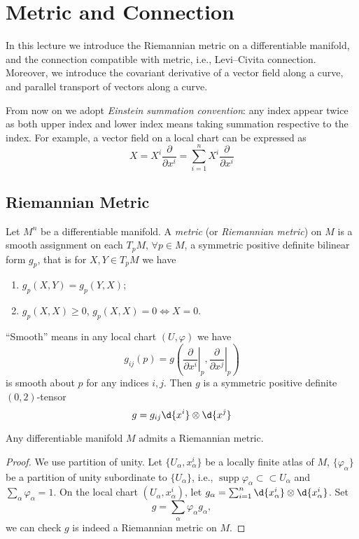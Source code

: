 \chapter{Metric and Connection}

In this lecture we introduce the Riemannian metric on a differentiable manifold, and the connection compatible with metric, i.e., Levi--Civita connection.
Moreover, we introduce the covariant derivative of a vector field along a curve, and parallel transport of vectors along a curve.

\begin{symb}
    From now on we adopt \emph{Einstein summation convention}:
    any index appear twice as both upper index and lower index means taking summation respective to the index.
    For example, a vector field on a local chart can be expressed as
    \[X=X^i\frac{\partial{}}{\partial{x^i}}=\sum_{i=1}^nX^i\frac{\partial{}}{\partial{x^i}}\]
\end{symb}

\section{Riemannian Metric}

\begin{defn}
    Let $M^n$ be a differentiable manifold.
    A \emph{metric} (or \emph{Riemannian metric}) on $M$ is a smooth assignment on each $T_pM$, $\forall p\in M$, a symmetric positive definite bilinear form $g_p$, that is for $X,Y\in T_pM$ we have
    \begin{enumerate}
        \item $g_p(X,Y)=g_p(Y,X)$;
        \item $g_p(X,X)\geq 0$, $g_p(X,X)=0\iff X=0$.
    \end{enumerate}
    ``Smooth'' means in any local chart $(U,\varphi)$ we have
    \[g_{ij}(p)=g\left(\left.\frac{\partial{}}{\partial{x^i}}\right|_p,\left.\frac{\partial{}}{\partial{x^j}}\right|_p\right)\]
    is smooth about $p$ for any indices $i,j$.
    Then $g$ is a symmetric positive definite $(0,2)$-tensor
    \[g=g_{ij}\d{x^i}\otimes\d{x^j}\]
\end{defn}

\begin{prop}
    Any differentiable manifold $M$ admits a Riemannian metric.
\end{prop}
\begin{proof}
    We use partition of unity.
    Let $\{U_\alpha,x_\alpha^i\}$ be a locally finite atlas of $M$, $\{\varphi_\alpha\}$ be a partition of unity subordinate to $\{U_\alpha\}$, i.e., $\operatorname{supp}\varphi_\alpha\subset\subset U_\alpha$ and $\sum_\alpha\varphi_\alpha=1$.
    On the local chart $(U_\alpha,x_\alpha^i)$, let $g_\alpha=\sum_{i=1}^n\d{x_\alpha^i}\otimes\d{x_\alpha^i}$.
    Set
    \[g=\sum_{\alpha}\varphi_\alpha g_\alpha,\]
    we can check $g$ is indeed a Riemannian metric on $M$.
\end{proof}

